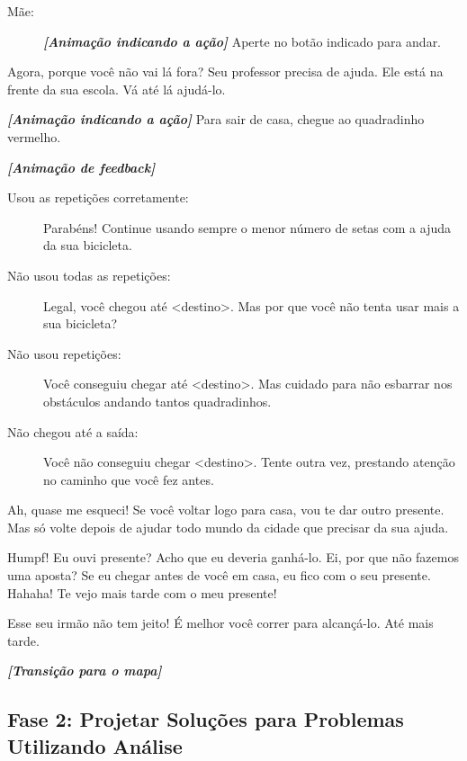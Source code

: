 \begin{description}
\begin{description}
\begin{description}
            \item[Mãe:] \textbf{\textit{[Animação indicando a ação]}} Aperte no botão indicado para andar.
		\end{description}
        \item[Mãe:] Agora, porque você não vai lá fora? Seu professor precisa de ajuda. Ele está na frente da sua escola. Vá até lá ajudá-lo.
        \item[Mãe:] \textbf{\textit{[Animação indicando a ação]}} Para sair de casa, chegue ao quadradinho vermelho.
        \item \textbf{\textit{[Animação de feedback]}}
        \begin{description}
            \item[]
        	\item[Usou as repetições corretamente:] Parabéns! Continue usando sempre o menor número de setas com a ajuda da sua bicicleta.
			\item[Não usou todas as repetições:] Legal, você chegou até <destino>. Mas por que você não tenta usar mais a sua bicicleta?
			\item[Não usou repetições:] Você conseguiu chegar até <destino>. Mas cuidado para não esbarrar nos obstáculos andando tantos quadradinhos.
			\item[Não chegou até a saída:] Você não conseguiu chegar <destino>. Tente outra vez, prestando atenção no caminho que você fez antes.
        \end{description}
        \item[Mãe:] Ah, quase me esqueci! Se você voltar logo para casa, vou te dar outro presente. Mas só volte depois de ajudar todo mundo da cidade que precisar da sua ajuda.
        \item[Irmão/Irmã:] Humpf! Eu ouvi presente? Acho que eu deveria ganhá-lo. Ei, por que não fazemos uma aposta? Se eu chegar antes de você em casa, eu fico com o seu presente. Hahaha! Te vejo mais tarde com o meu presente!
        \item[Mãe:] Esse seu irmão não tem jeito! É melhor você correr para alcançá-lo. Até mais tarde.
        \item \textbf{\textit{[Transição para o mapa]}}
    \end{description}
\end{description}

\subsection{Fase 2: Projetar Soluções para Problemas Utilizando Análise} \label{ssec:fase_2}


